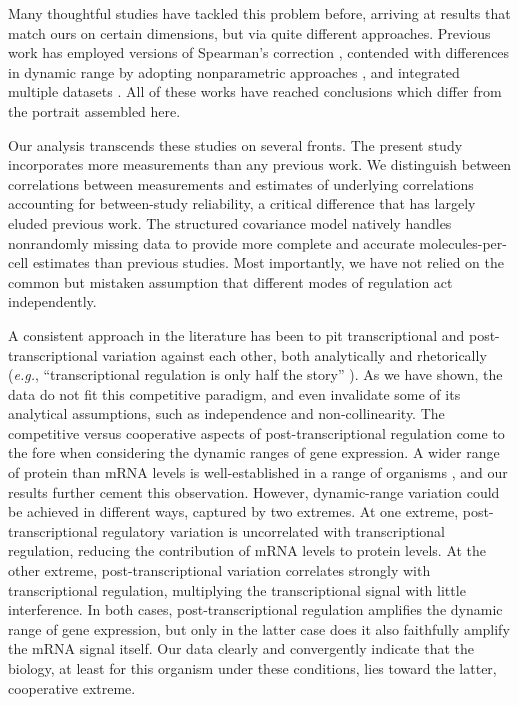 \documentclass[10pt]{article}
\newcommand{\eg}{\textit{e.g.}}
\begin{document}
Many thoughtful studies have tackled this problem before, arriving at results that match ours on certain dimensions, but via quite different approaches. Previous work has employed versions of Spearman's correction \cite{Vogel2010}, contended with differences in dynamic range by adopting nonparametric approaches \cite{lu07,desousa09}, and integrated multiple datasets \cite{brockmann07, lu07, siwiak10, wang12}. All of these works have reached conclusions which differ from the portrait assembled here.

Our analysis transcends these studies on several fronts. The present study incorporates more measurements than any previous work. We distinguish between correlations between measurements and estimates of underlying correlations accounting for between-study reliability, a critical difference that has largely eluded previous work. The structured covariance model natively handles nonrandomly missing data to provide more complete and accurate molecules-per-cell estimates than previous studies. Most importantly, we have not relied on the common but mistaken assumption that different modes of regulation act independently.

A consistent approach in the literature has been to pit transcriptional and post-transcriptional variation against each other, both analytically and rhetorically (\eg, ``transcriptional regulation is only half the story'' \cite{plotkin10}). As we have shown, the data do not fit this competitive paradigm, and even invalidate some of its analytical assumptions, such as independence and non-collinearity. The competitive versus cooperative aspects of post-transcriptional regulation come to the fore when considering the dynamic ranges of gene expression. A wider range of protein than mRNA levels is well-established in a range of organisms \cite{Vogel2010, schwanhausser11, marguerat12}, and our results further cement this observation. However, dynamic-range variation could be achieved in different ways, captured by two extremes. At one extreme, post-transcriptional regulatory variation is uncorrelated with transcriptional regulation, reducing the contribution of mRNA levels to protein levels. At the other extreme, post-transcriptional variation correlates strongly with transcriptional regulation, multiplying the transcriptional signal with little interference. In both cases, post-transcriptional regulation amplifies the dynamic range of gene expression, but only in the latter case does it also faithfully amplify the mRNA signal itself. Our data clearly and convergently indicate that the biology, at least for this organism under these conditions, lies toward the latter, cooperative extreme.
\end{document}
